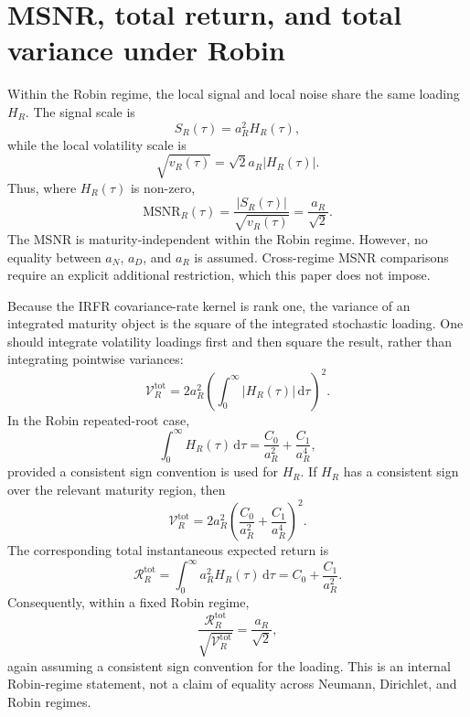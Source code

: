 \documentclass[11pt]{article}
\newcommand{\MSNR}{\mathrm{MSNR}}
\newcommand{\dd}{\,\mathrm{d}}
\numberwithin{equation}{section}
\begin{document}
\section{MSNR, total return, and total variance under Robin}

Within the Robin regime, the local signal and local noise share the same loading $H_R$. The signal scale is
\begin{equation}
S_R(\tau)=a_R^2H_R(\tau),
\end{equation}
while the local volatility scale is
\begin{equation}
\sqrt{v_R(\tau)}=\sqrt{2}a_R|H_R(\tau)|.
\end{equation}
Thus, where $H_R(\tau)$ is non-zero,
\begin{equation}
\label{eq:robin-msnr}
\MSNR_R(\tau)=\frac{|S_R(\tau)|}{\sqrt{v_R(\tau)}}=\frac{a_R}{\sqrt{2}}.
\end{equation}
The MSNR is maturity-independent within the Robin regime. However, no equality between $a_N$, $a_D$, and $a_R$ is assumed. Cross-regime MSNR comparisons require an explicit additional restriction, which this paper does not impose.

Because the IRFR covariance-rate kernel is rank one, the variance of an integrated maturity object is the square of the integrated stochastic loading. One should integrate volatility loadings first and then square the result, rather than integrating pointwise variances:
\begin{equation}
\mathcal{V}^{\mathrm{tot}}_R
=
2a_R^2\left(\int_0^\infty |H_R(\tau)|\dd\tau\right)^2.
\end{equation}
In the Robin repeated-root case,
\begin{equation}
\int_0^\infty H_R(\tau)\dd\tau
=
\frac{C_0}{a_R^2}+\frac{C_1}{a_R^4},
\end{equation}
provided a consistent sign convention is used for $H_R$. If $H_R$ has a consistent sign over the relevant maturity region, then
\begin{equation}
\mathcal{V}^{\mathrm{tot}}_R
=
2a_R^2\left(\frac{C_0}{a_R^2}+\frac{C_1}{a_R^4}\right)^2.
\end{equation}
The corresponding total instantaneous expected return is
\begin{equation}
\mathcal{R}^{\mathrm{tot}}_R
=
\int_0^\infty a_R^2H_R(\tau)\dd\tau
=
C_0+\frac{C_1}{a_R^2}.
\end{equation}
Consequently, within a fixed Robin regime,
\begin{equation}
\frac{\mathcal{R}^{\mathrm{tot}}_R}{\sqrt{\mathcal{V}^{\mathrm{tot}}_R}}
=
\frac{a_R}{\sqrt{2}},
\end{equation}
again assuming a consistent sign convention for the loading. This is an internal Robin-regime statement, not a claim of equality across Neumann, Dirichlet, and Robin regimes.
\end{document}
